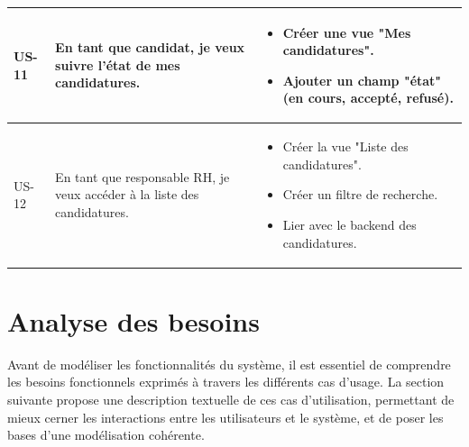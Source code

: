\begin{table}[H]
\begin{tabular}{|p{1cm}|p{8cm}|p{8cm}|}
US-11 & En tant que candidat, je veux suivre l’état de mes candidatures. 
& 
\begin{itemize}[leftmargin=*]
  \item Créer une vue "Mes candidatures".
  \item Ajouter un champ "état" (en cours, accepté, refusé).
\end{itemize} \\
\hline
US-12 & En tant que responsable RH, je veux accéder à la liste des candidatures. 
& 
\begin{itemize}[leftmargin=*]
  \item Créer la vue "Liste des candidatures".
  \item Créer un filtre de recherche.
  \item Lier avec le backend des candidatures.
\end{itemize} \\
\hline
\end{tabular}
\label{tab:sprint2_backlog}
\end{table}

\section{Analyse des besoins}
Avant de modéliser les fonctionnalités du système, il est essentiel de comprendre les besoins fonctionnels exprimés à travers les différents cas d’usage. La section suivante propose une description textuelle de ces cas d’utilisation, permettant de mieux cerner les interactions entre les utilisateurs et le système, et de poser les bases d’une modélisation cohérente.
    
